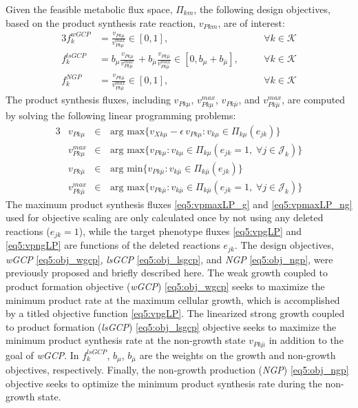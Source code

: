 Given the feasible metabolic flux space, $\Pi_{km}$, the following design objectives, based on the product synthesis rate reaction, $v_{Pkm}$, are of interest:
\begin{alignat}{3}
	f_k^{wGCP} & =\frac{v_{Pk\mu}}{v_{Pk\mu}^{max}}\in[0,1], \qquad & & \forall k\in \mathcal{K} \label{eq5:obj_wgcp}\\
	f_k^{lsGCP} & =b_{\mu} \frac{v_{Pk \mu}}{v_{Pk\mu}^{max}} \, + b_{\bar{\mu}} \frac{v_{Pk \bar{\mu}}}{v_{Pk\bar{\mu}}^{max}} \in[0,b_{\mu}+b_{\bar{\mu}}], \quad  & &  \forall k\in \mathcal{K} \label{eq5:obj_lsgcp}\\
	f_k^{NGP} & = \frac{v_{Pk \bar{\mu}}}{v_{Pk\bar{\mu}}^{max}} \in[0,1], \qquad  & &  \forall k\in \mathcal{K} \label{eq5:obj_ngp}
\end{alignat}
\noindent
The product synthesis fluxes, including $v_{Pk\mu}$, $v_{Pk\mu}^{max}$, $v_{Pk\bar{\mu}}$, and $v_{Pk\bar{\mu}}^{max}$, are computed by solving the following linear programming problems:
\begin{alignat}{3}
& v_{Pk\mu} 	&\in& \,	\text{arg }	\underset{}{\text{max}} \{v_{Xk\mu}-\epsilon \, v_{Pk\mu} : v_{k\mu}\in \Pi_{k\mu}(e_{jk})	\} \label{eq5:vpgLP}	\\
& v_{P k\mu}^{max} &\in& \,	\text{arg }	\underset{}{\text{max}} \{v_{Pk \mu} : v_{k \mu} \in \Pi_{k \mu} (e_{jk} = 1, \; \forall j\in \mathcal{J}_k) 	\}   \label{eq5:vpmaxLP_g}	\\
& v_{Pk \bar{\mu}} 	&\in& \,	\text{arg }	\underset{}{\text{min}} \{v_{Pk \bar{\mu}} : v_{k \bar{\mu}} \in \Pi_{k \bar{\mu}}(e_{jk})\} \label{eq5:vpngLP} \\
& v_{Pk\bar{\mu}}^{max} &\in& \,	 \text{arg }	\underset{}{\text{max}} \{v_{Pk \bar{\mu}} : v_{k \bar{\mu}} \in \Pi_{k \bar{\mu}}(e_{jk} = 1, \; \forall j\in \mathcal{J}_k)\}  \label{eq5:vpmaxLP_ng}
\end{alignat}
\noindent
The maximum product synthesis fluxes \eqref{eq5:vpmaxLP_g} and \eqref{eq5:vpmaxLP_ng} used for objective scaling are only calculated once by not using any deleted reactions ($e_{jk}=1$), while the target phenotype fluxes \eqref{eq5:vpgLP} and \eqref{eq5:vpngLP} are functions of the deleted reactions $e_{jk}$. The design objectives, \textit{wGCP} \eqref{eq5:obj_wgcp}, \textit{lsGCP} \eqref{eq5:obj_lsgcp}, and \textit{NGP} \eqref{eq5:obj_ngp}, were previously proposed \citep{garcia2019} and briefly described here. The weak growth coupled to product formation objective (\textit{wGCP}) \eqref{eq5:obj_wgcp} seeks to maximize the minimum product rate at the maximum cellular growth, which is accomplished by a titled objective function\citep{feist2010} \eqref{eq5:vpgLP}. The linearized strong growth coupled to product formation (\textit{lsGCP}) \eqref{eq5:obj_lsgcp} objective seeks to maximize the minimum product synthesis rate at the non-growth state $v_{Pk\bar{\mu}}$ in addition to the goal of \textit{wGCP}.
In $f_k^{lsGCP}$, $b_{\mu}$, $b_{\bar{\mu}}$ are the weights on the growth  and non-growth objectives, respectively.
Finally, the non-growth production (\textit{NGP}) \eqref{eq5:obj_ngp} objective seeks to optimize the minimum product synthesis rate during the non-growth state.


